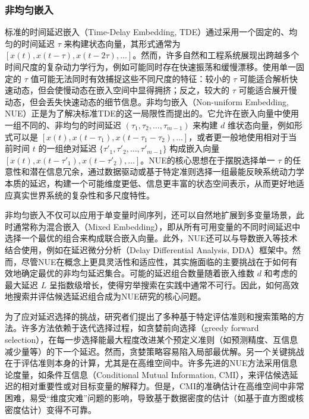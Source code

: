 \subsubsection{非均匀嵌入}
标准的时间延迟嵌入（Time-Delay Embedding, TDE）通过采用一个固定的、均匀的时间延迟 $\tau$ 来构建状态向量，其形式通常为 $[x(t), x(t-\tau), x(t-2\tau), \dots]$。然而，许多自然和工程系统展现出跨越多个时间尺度的复杂动力学行为，例如可能同时存在快速振荡和缓慢漂移。使用单一固定的 $\tau$ 值可能无法同时有效捕捉这些不同尺度的特征：较小的 $\tau$ 可能适合解析快速动态，但会使慢动态在嵌入空间中显得拥挤；反之，较大的 $\tau$ 可能适合展开慢动态，但会丢失快速动态的细节信息。非均匀嵌入（Non-uniform Embedding, NUE）\cite{jia2019detecting}正是为了解决标准TDE的这一局限性而提出的。它允许在嵌入向量中使用一组不同的、非均匀的时间延迟 $(\tau_1, \tau_2, \dots, \tau_{m-1})$ 来构建 $d$ 维状态向量，例如形式可以是 $[x(t), x(t-\tau_1), x(t-\tau_1-\tau_2), \dots]$，或者更一般地使用相对于当前时间 $t$ 的一组绝对延迟 $\{\tau'_1, \tau'_2, \dots, \tau'_{m-1}\}$ 构成嵌入向量 $[x(t), x(t-\tau'_1), x(t-\tau'_2), \dots]$。NUE的核心思想在于摆脱选择单一 $\tau$ 的任意性和潜在信息冗余，通过数据驱动或基于特定准则选择一组最能反映系统动力学本质的延迟，构建一个可能维度更低、信息更丰富的状态空间表示，从而更好地适应真实世界系统的复杂性和多尺度特性。

非均匀嵌入不仅可以应用于单变量时间序列，还可以自然地扩展到多变量场景，此时通常称为混合嵌入（Mixed Embedding），即从所有可用变量的不同时间延迟中选择一个最优的组合来构成联合嵌入向量。此外，NUE还可以与导数嵌入等技术结合使用，例如在延迟微分分析（Delay Differential Analysis, DDA）框架中。然而，尽管NUE在概念上更具灵活性和适应性，其实施面临的主要挑战在于如何有效地确定最优的非均匀延迟集合。可能的延迟组合数量随着嵌入维数 $d$ 和考虑的最大延迟 $L$ 呈指数级增长，使得穷举搜索在实践中通常不可行。因此，如何高效地搜索并评估候选延迟组合成为NUE研究的核心问题。

为了应对延迟选择的挑战，研究者们提出了多种基于特定评估准则和搜索策略的方法。许多方法依赖于迭代选择过程，如贪婪前向选择（greedy forward selection），在每一步选择能最大程度改进某个预定义准则（如预测精度、互信息减少量等）的下一个延迟。然而，贪婪策略容易陷入局部最优解。另一个关键挑战在于评估准则本身的计算，尤其是在高维空间中。许多先进的NUE方法采用信息论度量，如条件互信息（Conditional Mutual Information, CMI）\cite{jia2020refined}，来评估候选延迟的相对重要性或对目标变量的解释力。但是，CMI的准确估计在高维空间中非常困难，易受“维度灾难”问题的影响，导致基于数据密度的估计（如基于直方图或核密度估计）变得不可靠。

